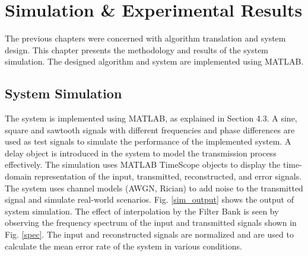 \chapter{Simulation \& Experimental Results}
The previous chapters were concerned with algorithm translation and system design. This chapter presents the methodology and results of the system simulation. The designed algorithm and system are implemented using MATLAB.

\section{System Simulation}
The system is implemented using MATLAB, as explained in Section 4.3. A sine, square and sawtooth signals with different frequencies and phase differences are used as test signals to simulate the performance of the implemented system. A delay object is introduced in the system to model the transmission process effectively. The simulation uses MATLAB TimeScope objects to display the time-domain representation of the input, transmitted, reconstructed, and error signals. The system uses channel models (AWGN, Rician) to add noise to the transmitted signal and simulate real-world scenarios. Fig. \ref{sim_output} shows the output of system simulation. The effect of interpolation by the Filter Bank is seen by observing the frequency spectrum of the input and transmitted signals shown in Fig. \ref{spec}. The input and reconstructed signals are normalized and are used to calculate the mean error rate of the system in various conditions. 

